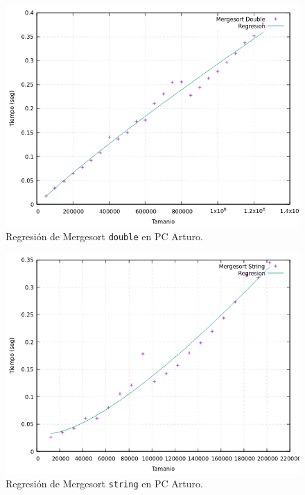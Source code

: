 \documentclass[12pt]{article}
\begin{document}
    \begin{figure}
        \centering
        \includegraphics[width=0.8\linewidth]{images/Mergesort/Mergesort_Regresion_Dbl.png}
        \cprotect\caption{Regresión de Mergesort \verb|double| en PC Arturo.}
        \label{fig:MergesortRegresionDouble}
    \end{figure}

    \begin{figure}
        \centering
        \includegraphics[width=0.8\linewidth]{images/Mergesort/Mergesort_Regresion_String.png}
        \cprotect\caption{Regresión de Mergesort \verb|string| en PC Arturo.}
        \label{fig:MergesortRegresionString}
    \end{figure}
\end{document}
